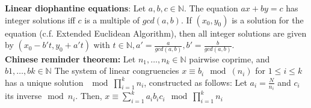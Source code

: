 \textbf{Linear diophantine equations}: Let $a,b,c \in \mathbb{N}$. 
The equation $ax+by=c$ has integer solutions iff $c$ is a multiple of $gcd(a,b)$.
If $(x_0,y_0)$ is a solution for the equation (c.f. Extended Euclidean Algorithm), 
then all integer solutions are given by $(x_0-b't, y_0+a't)$ with $t \in \mathbb{N}, 
a'= \frac{a}{gcd(a,b)}, b'=\frac{b}{gcd(a,b)}$.\\
\textbf{Chinese reminder theorem:} Let $n_1,\ldots,n_k \in \mathbb{N}$ pairwise coprime,
and $b1,\ldots,bk \in \mathbb{N}$ The system of linear congruencies $x \equiv b_i \mod (n_i)$
for $1\leq i \leq k$ has a unique solution $\mod \prod_{i=1}^k n_i$, constructed as follows:
Let $a_i = \frac{N}{n_i}$ and $c_i$ its inverse$\mod n_i$. Then, $x\equiv\sum_{i=1}^{k} a_i b_i c_i \mod \prod_{i=1}^k n_i$